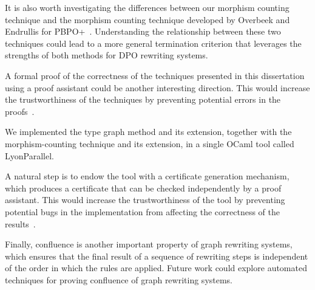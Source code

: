 \documentclass{report}
\begin{document}
It is also worth investigating the differences between our morphism counting technique and
 the morphism counting technique developed by Overbeek and Endrullis for PBPO+~\cite{overbeek2024termination_lmcs}. Understanding the relationship between these two techniques could lead to a more general termination criterion that leverages the strengths of both methods for DPO rewriting systems. 
 
A formal proof of the correctness of the techniques presented in this dissertation using a proof assistant could be another interesting direction. This would increase the trustworthiness of the techniques by preventing potential errors in the proofs~\cite{contejean2004certified}.

We implemented the type graph method and its extension, together with the morphism-counting technique and its extension, in a single OCaml tool called LyonParallel.

A natural step is to endow the tool with a certificate generation mechanism, which produces a certificate that can be checked independently by a proof assistant. This would increase the trustworthiness of the tool by preventing potential bugs in the implementation from affecting the correctness of the results~\cite{contejean2007certification,contejean2010a3pat}.
   
Finally, confluence is another important property of graph rewriting systems, which ensures that the final result of a sequence of rewriting steps is independent of the order in which the rules are applied. Future work could explore automated techniques for proving confluence of graph rewriting systems.

\printbibliography
\end{document}
